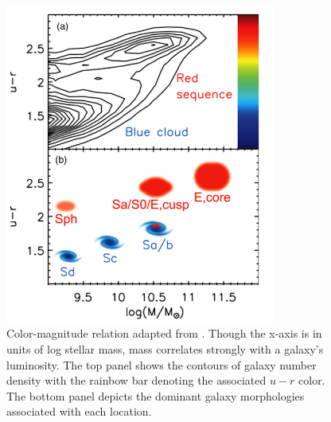 

\begin{figure}
\centering
\includegraphics[width=3.5in]{Figures/kormendy_CMR.png}
\caption[Galaxy color-magnitude relation.]{Color-magnitude relation adapted from \cite{Kormendy2012}. Though the x-axis is in units of log stellar mass, mass correlates strongly with a galaxy's luminosity. The top panel shows the contours of galaxy number density \citep{Baldry2004b} with the rainbow bar denoting the associated $u-r$ color. The bottom panel depicts the dominant galaxy morphologies associated with each location.}
\label{fig: CMR}
\end{figure}


